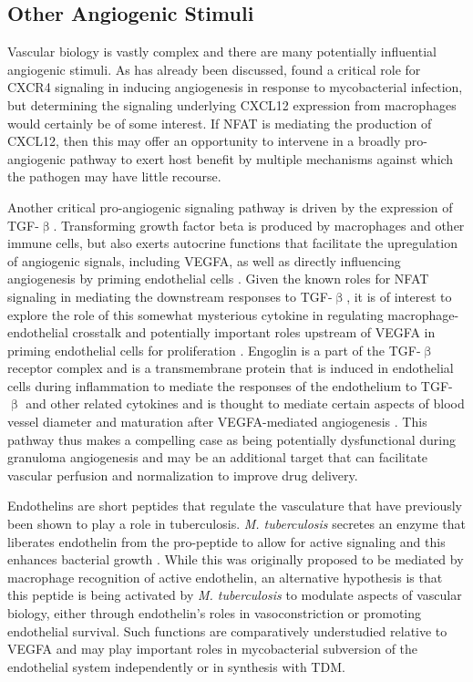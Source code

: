 \subsection{Other Angiogenic Stimuli}

Vascular biology is vastly complex and there are many potentially influential angiogenic stimuli. As has already been discussed, \citet{Torraca2017} found a critical role for CXCR4 signaling in inducing angiogenesis in response to mycobacterial infection, but determining the signaling underlying CXCL12 expression from macrophages would certainly be of some interest. If NFAT is mediating the production of CXCL12, then this may offer an opportunity to intervene in a broadly pro-angiogenic pathway to exert host benefit by multiple mechanisms against which the pathogen may have little recourse. 

Another critical pro-angiogenic signaling pathway is driven by the expression of TGF-$\upbeta$. Transforming growth factor beta is produced by macrophages and other immune cells, but also exerts autocrine functions that facilitate the upregulation of angiogenic signals, including VEGFA, as well as directly influencing angiogenesis by priming endothelial cells \citep{Jeon2007, Ferrari2009, Goumans2009}. Given the known roles for NFAT signaling in mediating the downstream responses to TGF-$\upbeta$, it is of interest to explore the role of this somewhat mysterious cytokine in regulating macrophage-endothelial crosstalk and potentially important roles upstream of VEGFA in priming endothelial cells for proliferation \citep{Cobbs2007}. Engoglin is a part of the TGF-$\upbeta$ receptor complex and is a transmembrane protein that is induced in endothelial cells during inflammation to mediate the responses of the endothelium to TGF-$\upbeta$ and other related cytokines and is thought to mediate certain aspects of blood vessel diameter and maturation after VEGFA-mediated angiogenesis \citep{Liu2014, Sugden2017}. This pathway thus makes a compelling case as being potentially dysfunctional during granuloma angiogenesis and may be an additional target that can facilitate vascular perfusion and normalization to improve drug delivery. 

Endothelins are short peptides that regulate the vasculature that have previously been shown to play a role in tuberculosis. \textit{M. tuberculosis} secretes an enzyme that liberates endothelin from the pro-peptide to allow for active signaling and this enhances bacterial growth \citep{Correa2014}. While this was originally proposed to be mediated by macrophage recognition of active endothelin, an alternative hypothesis is that this peptide is being activated by \textit{M. tuberculosis} to modulate aspects of vascular biology, either through endothelin's roles in vasoconstriction or promoting endothelial survival. Such functions are comparatively understudied relative to VEGFA and may play important roles in mycobacterial subversion of the endothelial system independently or in synthesis with TDM.

